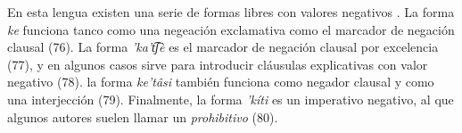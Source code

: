 En esta lengua existen una serie de formas libres con valores negativos \textcolor{MidnightBlue}{\citep{tarahumara}}. La forma {\setmainfont{Charis SIL} \textit{ke}} funciona tanco como una negeación exclamativa como el marcador de negación clausal (76). La forma {\setmainfont{Charis SIL} \textit{'ka't͡ʃè}} es el marcador de negación clausal por excelencia (77), y en algunos casos sirve para introducir cláusulas explicativas con valor negativo (78). la forma {\setmainfont{Charis SIL} \textit{ke'tâsi}} también funciona como negador clausal y como una interjección (79). Finalmente, la forma {\setmainfont{Charis SIL} \textit{'kíti}} es un imperativo negativo, al que algunos autores suelen llamar un \textit{prohibitivo} (80).